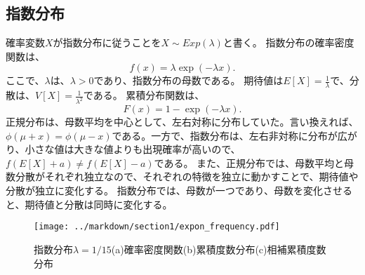 \documentclass[a4paper,11pt,dvipdfmx]{jsarticle}
\begin{document}
\subsection{指数分布}
確率変数$X$が指数分布に従うことを$X \sim Exp(\lambda)$と書く。
指数分布の確率密度関数は、
\begin{equation*}
    f(x)=\lambda \exp(-\lambda x).
\end{equation*}
ここで、$\lambda$は、$\lambda>0$であり、指数分布の母数である。
期待値は$E[X]=\frac{1}{\lambda}$で、分散は、$V[X]=\frac{1}{\lambda^2}$である。
累積分布関数は、
\begin{equation*}
    F(x)=1-\exp(-\lambda x).
\end{equation*}
正規分布は、母数平均を中心として、左右対称に分布していた。言い換えれば、$\phi(\mu+x)=\phi(\mu-x)$である。一方で、指数分布は、左右非対称に分布が広がり、小さな値は大きな値よりも出現確率が高いので、$f(E[X]+a)\neq f(E[X]-a)$である。
また、正規分布では、母数平均と母数分散がそれぞれ独立なので、それぞれの特徴を独立に動かすことで、期待値や分散が独立に変化する。
指数分布では、母数が一つであり、母数を変化させると、期待値と分散は同時に変化する。



\begin{figure}
    \begin{center}
        \texttt{[image: ../markdown/section1/expon\_frequency.pdf]}
        \caption{指数分布$\lambda=1/15$(a)確率密度関数(b)累積度数分布(c)相補累積度数分布}
        \label{expon_frequency}
    \end{center}
\end{figure}
\end{document}
